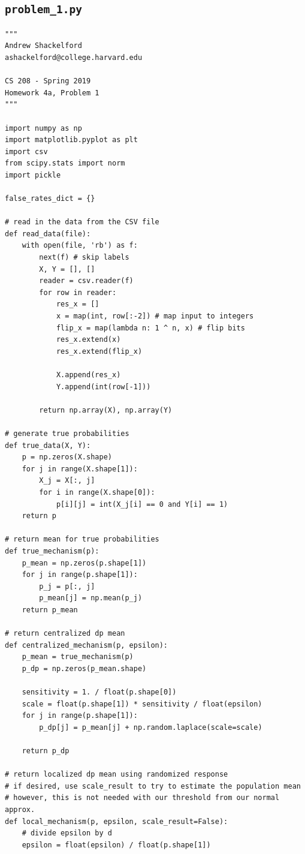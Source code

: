 \documentclass[12pt]{article}
\def\cl{\lstinline}
\begin{document}
\begin{appendices}

\section{\cl{problem_1.py}}
\label{appendix:problem_1}

\begin{lstlisting}
"""
Andrew Shackelford
ashackelford@college.harvard.edu

CS 208 - Spring 2019
Homework 4a, Problem 1
"""

import numpy as np
import matplotlib.pyplot as plt
import csv
from scipy.stats import norm
import pickle

false_rates_dict = {}

# read in the data from the CSV file
def read_data(file):
    with open(file, 'rb') as f:
        next(f) # skip labels
        X, Y = [], []
        reader = csv.reader(f)
        for row in reader:
            res_x = []
            x = map(int, row[:-2]) # map input to integers
            flip_x = map(lambda n: 1 ^ n, x) # flip bits
            res_x.extend(x)
            res_x.extend(flip_x)

            X.append(res_x)
            Y.append(int(row[-1]))

        return np.array(X), np.array(Y)

# generate true probabilities
def true_data(X, Y):
    p = np.zeros(X.shape)
    for j in range(X.shape[1]):
        X_j = X[:, j]
        for i in range(X.shape[0]):
            p[i][j] = int(X_j[i] == 0 and Y[i] == 1)
    return p

# return mean for true probabilities
def true_mechanism(p):
    p_mean = np.zeros(p.shape[1])
    for j in range(p.shape[1]):
        p_j = p[:, j]
        p_mean[j] = np.mean(p_j)
    return p_mean

# return centralized dp mean
def centralized_mechanism(p, epsilon):
    p_mean = true_mechanism(p)
    p_dp = np.zeros(p_mean.shape)

    sensitivity = 1. / float(p.shape[0])
    scale = float(p.shape[1]) * sensitivity / float(epsilon)
    for j in range(p.shape[1]):
        p_dp[j] = p_mean[j] + np.random.laplace(scale=scale)

    return p_dp

# return localized dp mean using randomized response
# if desired, use scale_result to try to estimate the population mean
# however, this is not needed with our threshold from our normal approx.
def local_mechanism(p, epsilon, scale_result=False):
    # divide epsilon by d
    epsilon = float(epsilon) / float(p.shape[1])


\end{lstlisting}
\end{appendices}
\end{document}
